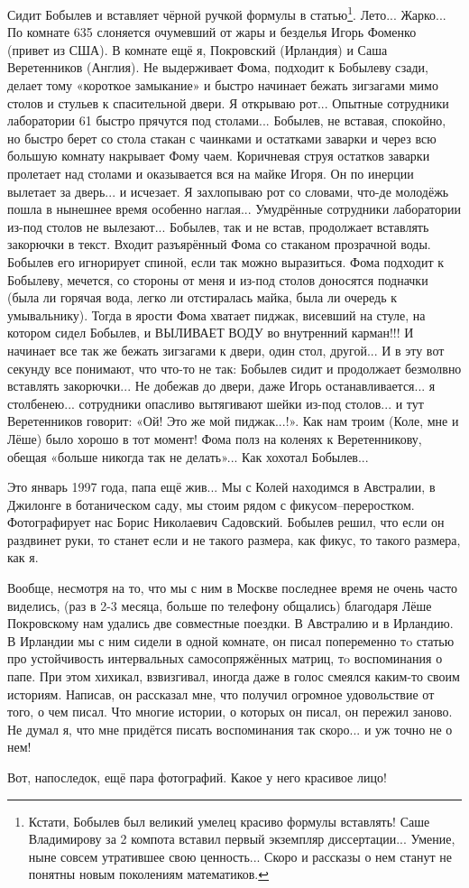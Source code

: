 Сидит Бобылев и вставляет чёрной ручкой формулы в статью\footnote{Кстати, Бобылев был великий умелец красиво формулы вставлять! Саше Владимирову за 2 компота вставил первый экземпляр диссертации... Умение, ныне совсем утратившее свою ценность... Скоро и рассказы о нем станут не понятны новым поколениям математиков.}. Лето... Жарко...
По комнате 635 слоняется очумевший от жары и безделья Игорь Фоменко (привет из США).
В комнате ещё я, Покровский (Ирландия) и Саша Веретенников (Англия). Не выдерживает Фома, подходит к Бобылеву сзади, делает тому «короткое замыкание» и быстро начинает бежать зигзагами мимо столов и стульев к спасительной двери. Я открываю рот... Опытные сотрудники лаборатории 61 быстро прячутся под столами... Бобылев, не вставая, спокойно, но быстро берет со стола стакан с чаинками и остатками заварки и через всю большую комнату накрывает Фому чаем. Коричневая струя остатков заварки пролетает над столами и оказывается вся на майке Игоря. Он по инерции вылетает за дверь... и исчезает. Я захлопываю рот со словами, что-де молодёжь пошла в нынешнее время особенно наглая... Умудрённые сотрудники лаборатории из-под столов не вылезают... Бобылев, так и не встав, продолжает вставлять закорючки в текст. Входит разъярённый Фома со стаканом прозрачной воды. Бобылев его игнорирует спиной, если так можно выразиться. Фома подходит к Бобылеву, мечется, со стороны от меня и из-под столов доносятся подначки (была ли горячая вода, легко ли отстиралась майка, была ли очередь к умывальнику). Тогда в ярости Фома хватает пиджак, висевший на стуле, на котором сидел Бобылев, и ВЫЛИВАЕТ ВОДУ во внутренний карман!!! И начинает все так же бежать зигзагами к двери, один стол, другой... И в эту вот секунду все понимают, что что-то не так: Бобылев сидит и продолжает безмолвно вставлять закорючки... Не добежав до двери, даже Игорь останавливается... я столбенею... сотрудники опасливо вытягивают шейки из-под столов... и тут Веретенников говорит: «Ой! Это же мой пиджак...!». Как нам троим (Коле, мне и Лёше) было хорошо в тот момент! Фома полз на коленях к Веретенникову, обещая «больше никогда так не делать»... Как хохотал Бобылев...

Это январь 1997 года, папа ещё жив... Мы с Колей находимся в Австралии, в Джилонге в ботаническом саду, мы стоим рядом с фикусом–переростком. Фотографирует нас Борис Николаевич Садовский. Бобылев решил, что если он раздвинет руки, то станет если и не такого размера, как фикус, то такого размера, как я.

Вообще, несмотря на то, что мы с ним в Москве последнее время не очень часто виделись, (раз в 2-3 месяца, больше по телефону общались) благодаря Лёше Покровскому нам удались две совместные поездки. В Австралию и в Ирландию. В Ирландии мы с ним сидели в одной комнате, он писал попеременно тo статью про устойчивость интервальных самосопряжённых матриц, тo воспоминания о папе. При этом хихикал, взвизгивал, иногда даже в голос смеялся каким-то своим историям. Написав, он рассказал мне, что получил огромное удовольствие от того, о чем писал. Что многие истории, о которых он писал, он пережил заново. Не думал я, что мне придётся писать воспоминания так скоро... и уж точно не о нем!

Вот, напоследок, ещё пара фотографий. Какое у него красивое лицо!
